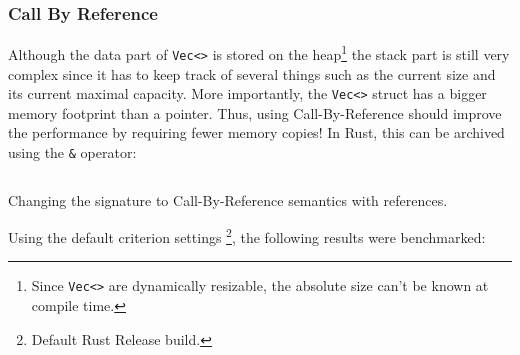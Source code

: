 \subsubsection{Call By Reference}
Although the data part of \texttt{Vec<>} is stored on the heap\footnote{Since \texttt{Vec<>} are dynamically resizable, the absolute size can't be known at compile time.} the stack part is still very complex since it has to keep track of several things such as the current size and its current maximal capacity. More importantly, the \texttt{Vec<>} struct has a bigger memory footprint than a pointer. Thus, using Call-By-Reference should improve the performance by requiring fewer memory copies! In Rust, this can be archived using the \texttt{\&} operator:

\begin{listing}[H]
  \inputminted{rust}{./assets/call_by_ref.rs}
\caption{Changing the signature to Call-By-Reference semantics with references.}
\end{listing}

Using the default criterion settings \footnote{Default Rust Release build.}, the following results were benchmarked:


